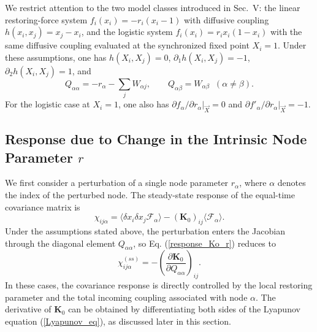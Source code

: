 We restrict attention to the two model classes introduced in Sec.~V: the linear restoring-force system $f_i(x_i)=-r_i(x_i-1)$ with diffusive coupling $h(x_i,x_j)=x_j-x_i$, and the logistic system $f_i(x_i)=r_i x_i(1-x_i)$ with the same diffusive coupling evaluated at the synchronized fixed point $X_i=1$. Under these assumptions, one has $h(X_i,X_j)=0$, $\partial_1 h(X_i,X_j)=-1$, $\partial_2 h(X_i,X_j)=1$, and
\begin{equation}
    Q_{\alpha\alpha}=-r_\alpha-\sum_j W_{\alpha j},\qquad Q_{\alpha\beta}=W_{\alpha\beta}\;\;(\alpha\neq\beta).
\end{equation}
For the logistic case at $X_i=1$, one also has $\partial f_\alpha/\partial r_\alpha|_{\vec X}=0$ and $\partial f'_\alpha/\partial r_\alpha|_{\vec X}=-1$.
\subsection{Response due to Change in the Intrinsic Node Parameter $r$}
\quad We first consider a perturbation of a single node parameter $r_\alpha$, where $\alpha$ denotes the index of the perturbed node. The steady-state response of the equal-time covariance matrix is
\begin{equation}
    \chi_{ij\alpha} = \langle \delta x_i \delta x_j \mathscr{F}_\alpha \rangle - (\mathbf{K}_0)_{ij} \langle \mathscr{F}_\alpha \rangle.
    \label{response_Ko_r}
\end{equation}
Under the assumptions stated above, the perturbation enters the Jacobian through the diagonal element $Q_{\alpha\alpha}$, so Eq. (\ref{response_Ko_r}) reduces to
\begin{equation}
    \chi_{ij\alpha}^{(ss)} = -\left(\frac{\partial \mathbf{K}_0}{\partial Q_{\alpha\alpha}} \right)_{ij}.
    \label{chiKodr_ss}
\end{equation}
In these cases, the covariance response is directly controlled by the local restoring parameter and the total incoming coupling associated with node $\alpha$. The derivative of $\mathbf{K}_0$ can be obtained by differentiating both sides of the Lyapunov equation (\ref{Lyapunov_eq}), as discussed later in this section.
